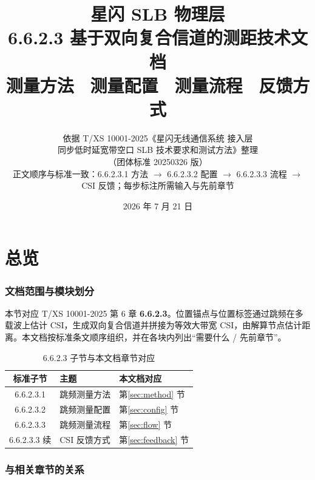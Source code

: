 \documentclass[11pt,a4paper]{ctexart}
\title{%
  \textbf{星闪 SLB 物理层}\\[0.4em]
  \Large 6.6.2.3 基于双向复合信道的测距技术文档\\[0.3em]
  \large 测量方法 \textbullet\ 测量配置 \textbullet\ 测量流程 \textbullet\ 反馈方式
}
\author{依据 T/XS 10001-2025《星闪无线通信系统 接入层\\
同步低时延宽带空口 SLB 技术要求和测试方法》整理\\
（团体标准 20250326 版）\\[0.3em]
\small 正文顺序与标准一致：6.6.2.3.1 方法 $\rightarrow$ 6.6.2.3.2 配置 $\rightarrow$ 6.6.2.3.3 流程 $\rightarrow$ CSI 反馈；每步标注所需输入与先前章节}
\date{2026 年 7 月 21 日}
\begin{document}
\maketitle
\tableofcontents
\newpage

\part{总览}

\section{文档范围与模块划分}

本节对应 T/XS 10001-2025 第 6 章 \textbf{6.6.2.3}。位置锚点与位置标签通过跳频在多载波上估计 CSI，生成双向复合信道并拼接为等效大带宽 CSI，由解算节点估计距离。本文档按标准条文顺序组织，并在各块内列出``需要什么 / 先前章节''。

\begin{table}[h]
\centering
\small
\caption{6.6.2.3 子节与本文档章节对应}
\begin{tabular}{clp{7cm}}
\toprule
\textbf{标准子节} & \textbf{主题} & \textbf{本文档对应} \\
\midrule
6.6.2.3.1 & 跳频测量方法 & 第\ref{sec:method} 节 \\
6.6.2.3.2 & 跳频测量配置 & 第\ref{sec:config} 节 \\
6.6.2.3.3 & 跳频测量流程 & 第\ref{sec:flow} 节 \\
6.6.2.3.3 续 & CSI 反馈方式 & 第\ref{sec:feedback} 节 \\
\bottomrule
\end{tabular}
\end{table}

\section{与相关章节的关系}
\end{document}

